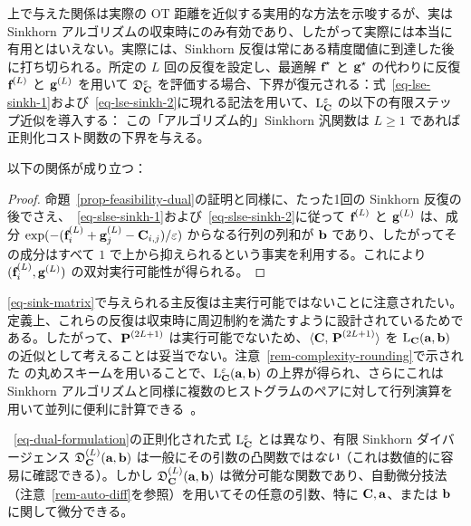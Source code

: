 上で与えた関係は実際の OT 距離を近似する実用的な方法を示唆するが、実は Sinkhorn アルゴリズムの収束時にのみ有効であり、したがって実際には本当に有用とはいえない。実際には、Sinkhorn 反復は常にある精度閾値に到達した後に打ち切られる。所定の $L$ 回の反復を設定し、最適解 $\fD^\star$ と $\gD^\star$ の代わりに反復 $\itL{\fD}$ と $\itL{\gD}$ を用いて $\SINKHORND_\C^\varepsilon$ を評価する場合、下界が復元される：式~\eqref{eq-lse-sinkh-1}および~\eqref{eq-lse-sinkh-2}に現れる記法を用いて、$\MKD_\C^\varepsilon$ の以下の有限ステップ近似を導入する：
この「アルゴリズム的」Sinkhorn 汎関数は $L\geq 1$ であれば正則化コスト関数の下界を与える。


\begin{prop}\label{defn-sinkhorn-div}
以下の関係が成り立つ：
\end{prop}
\begin{proof}命題~\ref{prop-feasibility-dual}の証明と同様に、たった1回の Sinkhorn 反復の後でさえ、~\eqref{eq-slse-sinkh-1}および~\eqref{eq-slse-sinkh-2}に従って $\itL{\fD}$ と $\itL{\gD}$ は、成分 $\exp(-(\itL{\fD}_i+\itL{\gD}_j-\C_{i,j})/\varepsilon)$ からなる行列の列和が $\b$ であり、したがってその成分はすべて $1$ で上から抑えられるという事実を利用する。これにより $(\itL{\fD}_i,\itL{\gD})$ の双対実行可能性が得られる。
\end{proof}

\begin{rem}
\eqref{eq-sink-matrix}で与えられる主反復は主実行可能ではないことに注意されたい。定義上、これらの反復は収束時に周辺制約を満たすように設計されているためである。したがって、$\P^{(2L+1)}$ は実行可能でないため、$\dotp{\C}{\P^{(2L+1)}}$ を $\MKD_\C(\a,\b)$ の近似として考えることは妥当でない。注意~\ref{rem-complexity-rounding}で示された \citet{altschuler2017near} の丸めスキームを用いることで、$\MKD_\C^\varepsilon(\a,\b)$ の上界が得られ、さらにこれは Sinkhorn アルゴリズムと同様に複数のヒストグラムのペアに対して行列演算を用いて並列に便利に計算できる~\citep{NIPS2018_8184}。
\end{rem}


\begin{rem} ~\eqref{eq-dual-formulation}の正則化された式 $\MKD_\C^\varepsilon$ とは異なり、有限 Sinkhorn ダイバージェンス $\itL{\SINKHORND_\C}(\a,\b)$ は一般にその引数の凸関数では\emph{ない}（これは数値的に容易に確認できる）。しかし $\itL{\SINKHORND_\C}(\a,\b)$ は微分可能な関数であり、自動微分技法（注意~\ref{rem-auto-diff}を参照）を用いてその任意の引数、特に $\C,\a$、または $\b$ に関して微分できる。
\end{rem}




